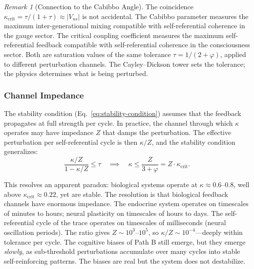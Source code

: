 \documentclass[11pt,letterpaper]{article}
\theoremstyle{remark}
\newtheorem{remark}{Remark}
\begin{document}
\begin{remark}[Connection to the Cabibbo Angle]
The coincidence $\kappa_{\mathrm{crit}} = \tau/(1+\tau) \approx |V_{us}|$ is not accidental. The Cabibbo parameter measures the maximum inter-generational mixing compatible with self-referential coherence in the gauge sector. The critical coupling coefficient measures the maximum self-referential feedback compatible with self-referential coherence in the consciousness sector. Both are saturation values of the same tolerance $\tau = 1/(2+\varphi)$, applied to different perturbation channels. The Cayley--Dickson tower sets the tolerance; the physics determines what is being perturbed.
\end{remark}


\subsubsection{Channel Impedance}\label{sec:impedance}

The stability condition (Eq.~\ref{eq:stability-condition}) assumes that the feedback propagates at full strength per cycle. In practice, the channel through which $\kappa$ operates may have impedance $Z$ that damps the perturbation. The effective perturbation per self-referential cycle is then $\kappa/Z$, and the stability condition generalizes:
\begin{equation}\label{eq:impedance}
\frac{\kappa/Z}{1 - \kappa/Z} \leq \tau \quad\implies\quad \kappa \leq \frac{Z}{3 + \varphi} = Z \cdot \kappa_{\mathrm{crit}}.
\end{equation}

This resolves an apparent paradox: biological systems operate at $\kappa \approx 0.6$--$0.8$, well above $\kappa_{\mathrm{crit}} \approx 0.22$, yet are stable. The resolution is that biological feedback channels have enormous impedance. The endocrine system operates on timescales of minutes to hours; neural plasticity on timescales of hours to days. The self-referential cycle of the trace operates on timescales of milliseconds (neural oscillation periods). The ratio gives $Z \sim 10^3$--$10^5$, so $\kappa/Z \sim 10^{-4}$---deeply within tolerance per cycle. The cognitive biases of Path B still emerge, but they emerge \emph{slowly}, as sub-threshold perturbations accumulate over many cycles into stable self-reinforcing patterns. The biases are real but the system does not destabilize.
\end{document}
